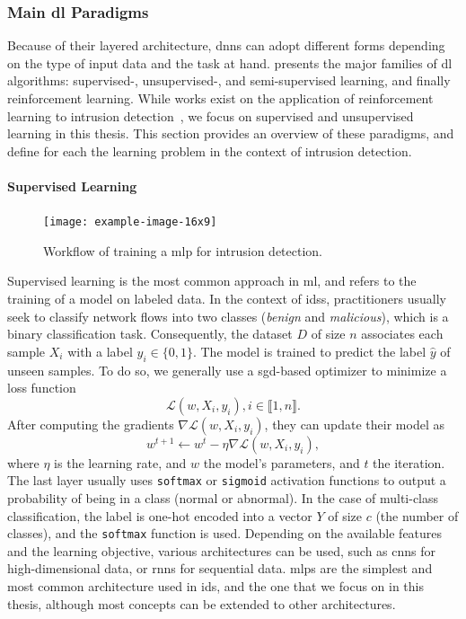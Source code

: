 \subsubsection{Main \Gls{dl} Paradigms}

Because of their layered architecture, \glspl{dnn} can adopt different forms depending on the type of input data and the task at hand.
 presents the major families of \gls{dl} algorithms: supervised-, unsupervised-, and semi-supervised learning, and finally reinforcement learning.
While works exist on the application of reinforcement learning to intrusion detection~\needref{}, we focus on supervised and unsupervised learning in this thesis.
This section provides an overview of these paradigms, and define for each the learning problem in the context of intrusion detection.

\paragraph{Supervised Learning}

\begin{figure}
  \centering
  \texttt{[image: example-image-16x9]}
  \caption{
    Workflow of training a \acrfull{mlp} for intrusion detection.
    \label{fig:bg.mlp}
  }
\end{figure}

Supervised learning is the most common approach in \gls{ml}, and refers to the training of a model on labeled data.
In the context of \glspl{ids}, practitioners usually seek to classify network flows into two classes (\emph{benign} and \emph{malicious}), which is a binary classification task.
Consequently, the dataset $D$ of size $n$ associates each sample $X_i$ with a label $y_i \in \lbrace 0,1 \rbrace $.
The model is trained to predict the label $\hat{y}$ of unseen samples.
To do so, we generally use a \gls{sgd}-based optimizer to minimize a loss function
\begin{equation} \label{eq:bg.loss}
  \mathcal{L}(w, X_i, y_i), i \in \llbracket 1, n \rrbracket.
\end{equation}
After computing the gradients $\nabla \mathcal{L}(w, X_i, y_i)$, they can update their model as
\begin{equation} \label{eq:bg.update}
  w^{t+1} \gets w^t - \eta \nabla \mathcal{L}(w, X_i, y_i),
\end{equation}
where $\eta$ is the learning rate, and $w$ the model's parameters, and $t$ the iteration.
The last layer usually uses \texttt{softmax} or \texttt{sigmoid} activation functions to output a probability of being in a class (normal or abnormal).
In the case of multi-class classification, the label is one-hot encoded\footnotemark{} into a vector $Y$ of size $c$ (the number of classes), and the \texttt{softmax} function is used.
Depending on the available features and the learning objective, various architectures can be used, such as \glspl{cnn} for high-dimensional data, or \glspl{rnn} for sequential data.
\Glspl{mlp} are the simplest and most common architecture used in \gls{ids}, and the one that we focus on in this thesis, although most concepts can be extended to other architectures.

